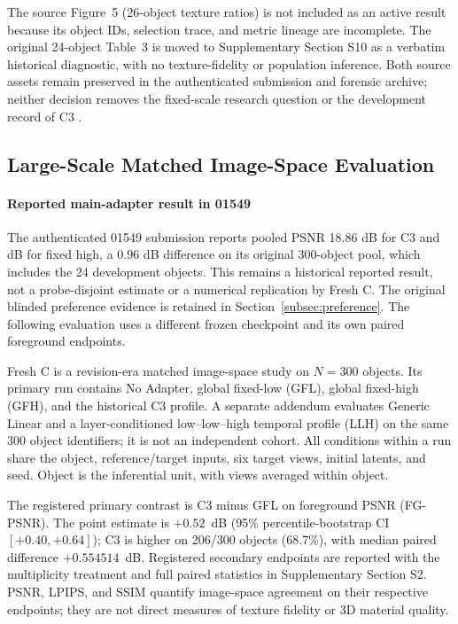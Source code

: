\documentclass[times,twocolumn,final]{elsarticle}
\providecommand{\DIFadd}[1]{{\protect\color{blue} \sf #1}} %
\providecommand{\DIFaddbegin}{} %
\providecommand{\DIFaddend}{} %
\begin{document}
  \DIFaddbegin \DIFadd{The source Figure~5 (26-object texture ratios) is not included as an active result because its object IDs, selection trace, and metric lineage are incomplete. The original 24-object Table~3 is moved to Supplementary Section S10 as a verbatim historical diagnostic, with no texture-fidelity or population inference. Both source assets remain preserved in the authenticated submission and forensic archive; neither decision removes the fixed-scale research question or the development record of }\DIFaddend C3  .

  \DIFaddbegin \subsection{Large-Scale Matched Image-Space Evaluation}
\label{subsec:largescale}
\DIFaddend 

  \DIFaddbegin \paragraph{Reported main-adapter result in 01549}
\DIFadd{The authenticated 01549 submission reports pooled PSNR 18.86 dB for }\DIFaddend C3   and   \DIFaddbegin \DIFadd{17.90 dB for fixed high, a 0.96 dB difference on its original 300-object pool, which includes the 24 development objects. This remains a historical reported result, not a probe-disjoint estimate or a numerical replication by Fresh C. The original blinded preference evidence is retained in Section~\ref{subsec:preference}. The following evaluation uses a different frozen checkpoint and its own paired foreground endpoints.
}

\DIFadd{Fresh C is a revision-era matched image-space study on $N=300$ objects. Its primary run contains No Adapter, global fixed-low (GFL), global fixed-high (GFH), and the historical }\DIFaddend C3   \DIFaddbegin \DIFadd{profile. A separate addendum evaluates Generic Linear and a layer-conditioned low--low--high temporal profile (LLH) on the same 300 object identifiers; it is not an independent cohort. All conditions within a run share the object, reference/target inputs, six target views, initial latents, and seed. Object is the inferential unit, with views averaged within object}\DIFaddend .

  \DIFaddbegin \DIFadd{The registered primary contrast is }\DIFaddend C3   \DIFaddbegin \DIFadd{minus GFL on foreground PSNR (FG-PSNR). The point estimate is $+0.52$~dB (95\% percentile-bootstrap CI $[+0.40,+0.64]$); C3 is higher on 206/300 objects (68.7\%), with median paired difference $+0.554514$~dB. Registered secondary endpoints are reported with the multiplicity treatment and full paired statistics in Supplementary Section S2. PSNR, LPIPS, and SSIM quantify image-space agreement on their respective endpoints; they are not direct measures of texture fidelity or 3D material quality}\DIFaddend .
\end{document}
